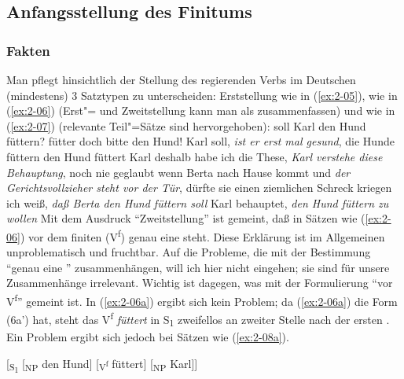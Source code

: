 \documentclass[output=paper]{langsci/langscibook}
\begin{document}
\subsection{Anfangsstellung des Finitums}%
\label{subsec:2-1-1}
\subsubsection{Fakten}%
\label{subsec:2-1-1-1}

Man pflegt hinsichtlich der Stellung des regierenden Verbs im Deutschen (mindestens) 3 Satztypen zu unterscheiden: Erststellung wie in (\ref{ex:2-05}),  wie in (\ref{ex:2-06}) (Erst"= und Zweitstellung kann man als  zusammenfassen) und  wie in (\ref{ex:2-07}) (relevante Teil"=Sätze sind hervorgehoben):
\eal \label{ex:2-05}
	\ex \label{ex:2-05a} soll Karl den Hund füttern?
	\ex \label{ex:2-05b} fütter doch bitte den Hund!
	\ex \label{ex:2-05c} Karl soll, \textit{ist er erst mal gesund}, die Hunde füttern
\zl
\eal \label{ex:2-06}
	\ex \label{ex:2-06a} den Hund füttert Karl
	\ex \label{ex:2-06b} deshalb habe ich die These, \textit{Karl verstehe diese Behauptung}, noch nie geglaubt
	\ex \label{ex:2-06c} wenn Berta nach Hause kommt und \textit{der Gerichtsvollzieher steht vor der Tür}, dürfte sie einen ziemlichen Schreck kriegen
\zl
\eal \label{ex:2-07}
	\ex \label{ex:2-07a} ich weiß, \textit{daß Berta den Hund füttern soll}
	\ex \label{ex:2-07b} Karl behauptet, \textit{den Hund füttern zu wollen}
\zl
Mit dem Ausdruck "`Zweitstellung"' ist gemeint, daß in Sätzen wie (\ref{ex:2-06}) vor dem finiten  (V\textsuperscript{f}) genau eine  steht. Diese Erklärung ist im Allgemeinen unproblematisch und fruchtbar. Auf die Probleme, die mit der Bestimmung "`genau eine "' zusammenhängen, will ich hier nicht eingehen; sie sind für unsere Zusammenhänge irrelevant. Wichtig ist dagegen, was mit der Formulierung "`vor V\textsuperscript{f}"' gemeint ist. In (\ref{ex:2-06a}) ergibt sich kein Problem; da (\ref{ex:2-06a}) die Form (6a') hat, steht das V\textsuperscript{f} \textit{füttert} in S\textsubscript{1} zweifellos an zweiter Stelle nach der ersten . Ein Problem ergibt sich jedoch bei Sätzen wie (\ref{ex:2-08a}).
\begin{exe}
	\begin{xlist}[a'.]
	\label{ex:2-06a'} [\textsubscript{S\textsubscript{1}} [\textsubscript{NP} den Hund] [\textsubscript{V\textsuperscript{f}} füttert] [\textsubscript{NP} Karl]] %
	\end{xlist}
\end{exe}
\end{document}
